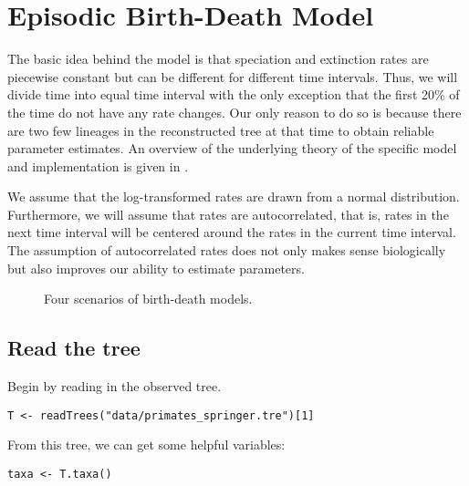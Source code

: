

\bigskip
\section{Episodic Birth-Death Model}

The basic idea behind the model is that speciation and extinction rates are piecewise constant but can be different for different time intervals.
Thus, we will divide time into equal time interval with the only exception that the first 20\% of the time do not have any rate changes.
Our only reason to do so is because there are two few lineages in the reconstructed tree at that time to obtain reliable parameter estimates.
An overview of the underlying theory of the specific model and implementation is given in \citep{Hoehna2015a}.

We assume that the log-transformed rates are drawn from a normal distribution.
Furthermore, we will assume that rates are autocorrelated, that is, rates in the next time interval will be centered around the rates in the current time interval.
The assumption of autocorrelated rates does not only makes sense biologically but also improves our ability to estimate parameters.
\begin{figure}[h!]
\centering
{}
\caption{\small Four scenarios of birth-death models.}
\label{fig:EBD}
\end{figure}



\subsection{Read the tree}

Begin by reading in the observed tree. 

{\tt \begin{snugshade*}
\begin{lstlisting}
T <- readTrees("data/primates_springer.tre")[1]
\end{lstlisting}
\end{snugshade*}}

From this tree, we can get some helpful variables:
{\tt \begin{snugshade*}
\begin{lstlisting}
taxa <- T.taxa()
\end{lstlisting}
\end{snugshade*}}

